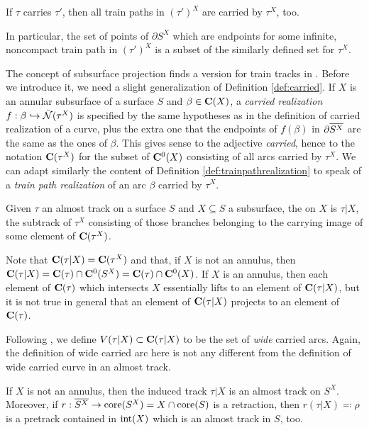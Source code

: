 \begin{rmk}\label{rmk:limitsetconsistency}
If $\tau$ carries $\tau'$, then all train paths in $(\tau')^X$ are carried by $\tau^X$, too.

In particular, the set of points of $\partial S^X$ which are endpoints for some infinite, noncompact train path in $(\tau')^X$ is a subset of the similarly defined set for $\tau^X$.
\end{rmk}

The concept of subsurface projection finds a version for train tracks in \cite{mms}. Before we introduce it, we need a slight generalization of Definition \ref{def:carried}. If $X$ is an annular subsurface of a surface $S$ and $\beta\in \mathbf C(X)$, a \emph{carried realization} $f:\beta \hookrightarrow \bar{{\mathcal N}}(\tau^X)$ is specified by the same hypotheses as in the definition of carried realization of a curve, plus the extra one that the endpoints of $f(\beta)$ in $\partial\overline{S^X}$ are the same as the ones of $\beta$. This gives sense to the adjective \emph{carried}, hence to the notation $\mathbf C(\tau^X)$ for the subset of $\mathbf C^0(X)$ consisting of all arcs carried by $\tau^X$. We can adapt similarly the content of Definition \ref{def:trainpathrealization} to speak of a \emph{train path realization} of an arc $\beta$ carried by $\tau^X$.

\begin{defin}
Given $\tau$ an almost track on a surface $S$ and $X\subseteq S$ a subsurface, the  on $X$ is $\tau|X$, the subtrack of $\tau^X$ consisting of those branches belonging to the carrying image of some element of $\mathbf C(\tau^X)$.
\end{defin}

Note that $\mathbf C(\tau|X)=\mathbf C(\tau^X)$ and that, if $X$ is not an annulus, then $\mathbf C(\tau|X)=\mathbf C(\tau)\cap\mathbf C^0(S^X)= \mathbf C(\tau)\cap\mathbf C^0(X)$. If $X$ is an annulus, then each element of $\mathbf C(\tau)$ which intersects $X$ essentially lifts to an element of $\mathbf C(\tau|X)$, but it is not true in general that an element of $\mathbf C(\tau|X)$ projects to an element of $\mathbf C(\tau)$.

Following \cite{mms}, we define $V(\tau|X)\subset \mathbf C(\tau|X)$ to be the set of \emph{wide} carried arcs. Again, the definition of wide carried arc here is not any different from the definition of wide carried curve in an almost track.

\begin{lemma}\label{lem:inducedisonsurface}
If $X$ is not an annulus, then the induced track $\tau|X$ is an almost track on $S^X$. Moreover, if $r:\overline{S^X}\rightarrow \mathrm{core}(S^X)=X\cap\mathrm{core}(S)$ is a retraction, then $r(\tau|X)\eqqcolon\rho$ is a pretrack contained in $\mathrm{int}(X)$ which is an almost track in $S$, too.
\end{lemma}


